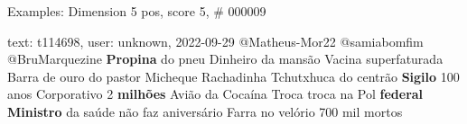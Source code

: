 \begin{frame}{Examples: Dimension 5 pos, score 5, \# 000009}
\footnotesize
\begin{exampleblock}{text: t114698, user: unknown, 2022-09-29}
@Matheus-Mor22 @samiabomfim @BruMarquezine \textbf{Propina} do pneu Dinheiro da 
mansão Vacina superfaturada Barra de ouro do pastor Micheque Rachadinha 
Tchutxhuca do centrão \textbf{Sigilo} 100 anos Corporativo 2 \textbf{milhões} 
Avião da Cocaína Troca troca na Pol \textbf{federal} \textbf{Ministro} da saúde 
não faz aniversário Farra no velório  700 mil mortos 
\end{exampleblock}
\end{frame}
